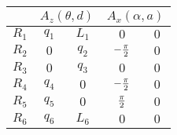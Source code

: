 \begin{tabular}{c|c|c|c|c|}  
            \cline{2-5} &
            \multicolumn{2}{|c|}{$A_z(\theta,d)$} &
            \multicolumn{2}{|c|}{$A_x(\alpha,a)$} \\
            \hline
        \multicolumn{1}{|c|}{$R_1$} & $q_{1}$ & $L_{1}$ & $0$ & $0$ \\
            \hline
        \multicolumn{1}{|c|}{$R_2$} & $0$ & $q_{2}$ & $-{{\pi}\over{2}}$ & $0$ \\
            \hline
        \multicolumn{1}{|c|}{$R_3$} & $0$ & $q_{3}$ & $0$ & $0$ \\
            \hline
        \multicolumn{1}{|c|}{$R_4$} & $q_{4}$ & $0$ & $-{{\pi}\over{2}}$ & $0$ \\
            \hline
        \multicolumn{1}{|c|}{$R_5$} & $q_{5}$ & $0$ & ${{\pi}\over{2}}$ & $0$ \\
            \hline
        \multicolumn{1}{|c|}{$R_6$} & $q_{6}$ & $L_{6}$ & $0$ & $0$ \\
            \hline
\end{tabular}
